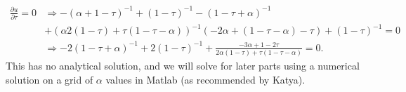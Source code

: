 \documentclass[11pt]{article} %
\begin{document}
\begin{align*}
\frac{\partial u}{\partial \tau} = 0 &\Rightarrow -(\alpha +1-\tau)^{-1} + (1-\tau)^{-1} - (1-\tau+\alpha)^{-1} \\&+ (\alpha 2(1-\tau) + \tau (1-\tau - \alpha))^{-1}(-2\alpha + (1-\tau-\alpha)-\tau) +(1-\tau)^{-1} =0\\
&\Rightarrow -2(1-\tau+\alpha)^{-1} + 2(1-\tau)^{-1} +\frac{-3\alpha + 1 - 2\tau}{2\alpha(1-\tau) + \tau(1-\tau-\alpha)} = 0.
\end{align*}
This has no analytical solution, and we will solve for later parts using a numerical solution on a grid of $\alpha$ values in Matlab (as recommended by Katya).


\end{document}
